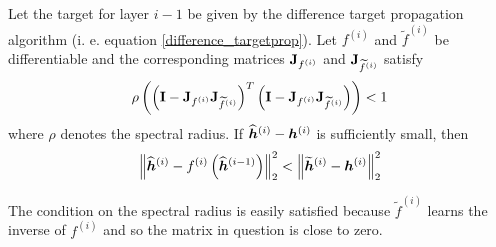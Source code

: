 \begin{theorem}
	Let the target for layer \( i - 1 \) be given by the difference target propagation algorithm (i. e. equation \ref{difference_targetprop}). Let \( f^{(i)} \) and \( \widetilde{f}^{(i)} \) be differentiable and the corresponding matrices \( \mathbf{J}_{f^{(i)}} \) and \( \mathbf{J}_{\widetilde{f}^{(i)}} \) satisfy
	\[ \rho \left( \left( \mathbf{I} - \mathbf{J}_{f^{(i)}} \mathbf{J}_{\widetilde{f}^{(i)}} \right)^T \left( \mathbf{I} - \mathbf{J}_{f^{(i)}} \mathbf{J}_{\widetilde{f}^{(i)}} \right) \right) < 1\]
	where \( \rho \) denotes the spectral radius. If \( \widehat{\bm{h}}^{(i)} - \bm{h}^{(i)} \) is sufficiently small, then
	\[ \left\lVert \widehat{\bm{h}}^{(i)} - f^{(i)} \left( \widehat{\bm{h}}^{(i - 1)} \right) \right\rVert^2_2 < \left\lVert \widetilde{\bm{h}}^{(i)} - \bm{h}^{(i)} \right\rVert^2_2 \]
\end{theorem}
The condition on the spectral radius is easily satisfied because \( \widetilde{f}^{(i)} \) learns the inverse of \( f^{(i)} \) and so the matrix in question is close to zero.

